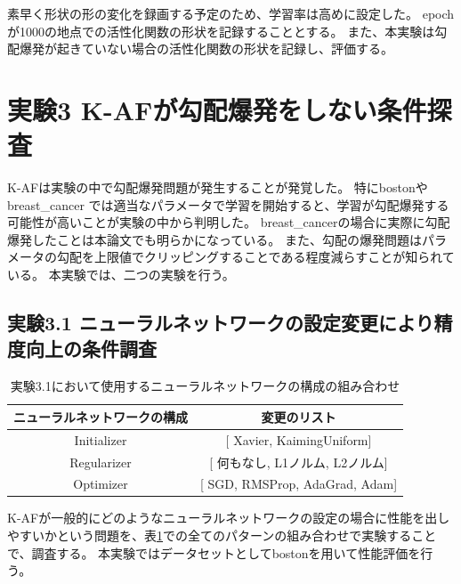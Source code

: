 素早く形状の形の変化を録画する予定のため、学習率は高めに設定した。
epochが1000の地点での活性化関数の形状を記録することとする。
また、本実験は勾配爆発が起きていない場合の活性化関数の形状を記録し、評価する。



\section{実験3 K-AFが勾配爆発をしない条件探査}
\label{exp3}

K-AFは実験の中で勾配爆発問題が発生することが発覚した。
特にbostonや breast\_cancer では適当なパラメータで学習を開始すると、学習が勾配爆発する可能性が高いことが実験の中から判明した。
breast\_cancerの場合に実際に勾配爆発したことは本論文でも明らかになっている。
また、勾配の爆発問題はパラメータの勾配を上限値でクリッピングすることである程度減らすことが知られている。
本実験では、二つの実験を行う。

\subsection{実験3.1 ニューラルネットワークの設定変更により精度向上の条件調査}
\label{exp3.1}

\begin{table}[htbp]
    \begin{center}
        \caption{実験3.1において使用するニューラルネットワークの構成の組み合わせ}
        \label{list:learning_algorithm_change3}
        \vspace{2mm} 
        \begin{tabular}{ |c|c| }
        \hline
        ニューラルネットワークの構成 & 変更のリスト \\
        \hline
        Initializer         & [ Xavier, KaimingUniform]   \\
        \hline
        Regularizer           & [ 何もなし, L1ノルム, L2ノルム]     \\
        \hline
        Optimizer         & [ SGD, RMSProp, AdaGrad, Adam]   \\
        \hline
        \end{tabular}
    \end{center}
\end{table}


K-AFが一般的にどのようなニューラルネットワークの設定の場合に性能を出しやすいかという問題を、表\ref{list:learning_algorithm_change3}での全てのパターンの組み合わせで実験することで、調査する。
本実験ではデータセットとしてbostonを用いて性能評価を行う。

